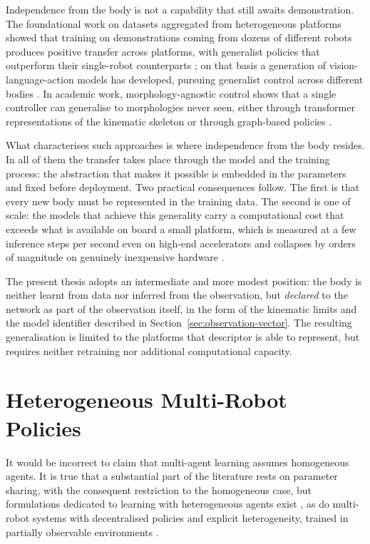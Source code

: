 Independence from the body is not a capability that still awaits demonstration.
The foundational work on datasets aggregated from heterogeneous platforms showed
that training on demonstrations coming from dozens of different robots produces
positive transfer across platforms, with generalist policies that outperform
their single-robot counterparts \cite{openx2024}; on that basis a generation of
vision-language-action models has developed, pursuing generalist control across
different bodies \cite{black2024pi0}. In academic work, morphology-agnostic
control shows that a single controller can generalise to morphologies never
seen, either through transformer representations of the kinematic skeleton
\cite{gupta2022metamorph} or through graph-based policies \cite{luo2025gcnt}.

What characterises such approaches is where independence from the body resides.
In all of them the transfer takes place through the model and the training
process: the abstraction that makes it possible is embedded in the parameters
and fixed before deployment. Two practical consequences follow. The first is
that every new body must be represented in the training data. The second is one
of scale: the models that achieve this generality carry a computational cost
that exceeds what is available on board a small platform, which is measured at
a few inference steps per second even on high-end accelerators
\cite{zhou2026vlaxpu} and collapses by orders of magnitude on genuinely
inexpensive hardware \cite{williams2025litevla}.

The present thesis adopts an intermediate and more modest position: the body is
neither learnt from data nor inferred from the observation, but \emph{declared}
to the network as part of the observation itself, in the form of the kinematic
limits and the model identifier described in
Section~\ref{sec:observation-vector}. The resulting generalisation is limited to
the platforms that descriptor is able to represent, but requires neither
retraining nor additional computational capacity.

\section{Heterogeneous Multi-Robot Policies}
\label{sec:rel-heterogeneous}

It would be incorrect to claim that multi-agent learning assumes homogeneous
agents. It is true that a substantial part of the literature rests on parameter
sharing, with the consequent restriction to the homogeneous case, but
formulations dedicated to learning with heterogeneous agents exist
\cite{zhong2024harl}, as do multi-robot systems with decentralised policies and
explicit heterogeneity, trained in partially observable environments
\cite{bettini2023hetero}.


